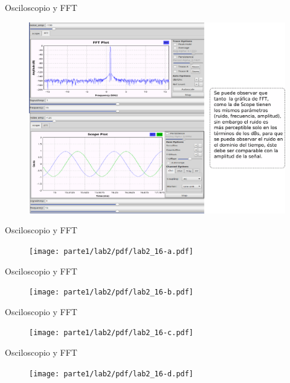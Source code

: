 \begin{frame}{Osciloscopio y FFT}
\begin{figure}[H]
\centering
\includegraphics[width=\textwidth, height=0.58\textwidth]{parte1/lab2/pdf/lab2_16.pdf}
\end{figure}
\end{frame}

\begin{frame}{Osciloscopio y FFT}
\begin{figure}[H]
\centering
\texttt{[image: parte1/lab2/pdf/lab2\_16-a.pdf]}
\end{figure}
\end{frame}

\begin{frame}{Osciloscopio y FFT}
\begin{figure}[H]
\centering
\texttt{[image: parte1/lab2/pdf/lab2\_16-b.pdf]}
\end{figure}
\end{frame}

\begin{frame}{Osciloscopio y FFT}
\begin{figure}[H]
\centering
\texttt{[image: parte1/lab2/pdf/lab2\_16-c.pdf]}
\end{figure}
\end{frame}

\begin{frame}{Osciloscopio y FFT}
\begin{figure}[H]
\centering
\texttt{[image: parte1/lab2/pdf/lab2\_16-d.pdf]}
\end{figure}
\end{frame}




